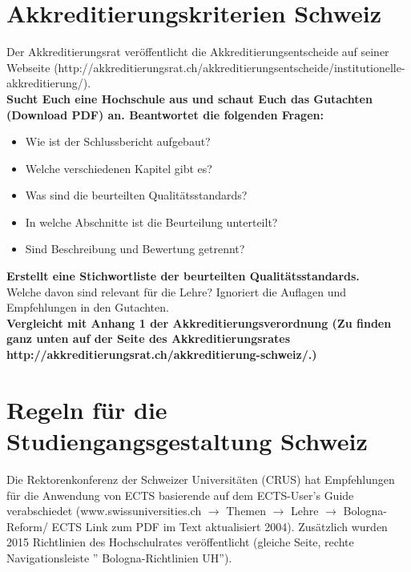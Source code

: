 \documentclass{scrartcl}
\begin{document}
\newpage
\section*{Akkreditierungskriterien Schweiz}
Der Akkreditierungsrat veröffentlicht die Akkreditierungsentscheide auf seiner Webseite (http://akkreditierungsrat.ch/akkreditierungsentscheide/institutionelle-akkreditierung/).\\

\vspace{0.5 cm}
\textbf{Sucht Euch eine Hochschule aus und schaut Euch das Gutachten (Download PDF) an. Beantwortet die folgenden Fragen:}
\begin{itemize}
\item Wie ist der Schlussbericht aufgebaut?
\item Welche verschiedenen Kapitel gibt es?
\item Was sind die beurteilten Qualitätsstandards?
\item In welche Abschnitte ist die Beurteilung unterteilt?
\item Sind Beschreibung und Bewertung getrennt?
\end{itemize}
\vspace{0.5 cm}
\textbf{Erstellt eine Stichwortliste der beurteilten Qualitätsstandards.\\}
Welche davon sind relevant für die Lehre?
Ignoriert die Auflagen und Empfehlungen in den Gutachten.\\ 

\vspace{0.5 cm}
 \textbf{Vergleicht mit Anhang 1 der Akkreditierungsverordnung (Zu finden ganz unten auf der Seite des Akkreditierungsrates\\ http://akkreditierungsrat.ch/akkreditierung-schweiz/.)}

\newpage
\section*{Regeln für die Studiengangsgestaltung Schweiz}
Die Rektorenkonferenz der Schweizer Universitäten (CRUS) hat Empfehlungen für die Anwendung von ECTS basierende auf dem ECTS-User's Guide verabschiedet (www.swissuniversities.ch $\rightarrow$ Themen $\rightarrow$ Lehre $\rightarrow$ Bologna-Reform/ ECTS Link zum PDF im Text aktualisiert 2004). Zusätzlich wurden 2015 Richtlinien des Hochschulrates veröffentlicht (gleiche Seite, rechte Navigationsleiste '' Bologna-Richtlinien UH'').

\vspace{0.5 cm}
\end{document}

